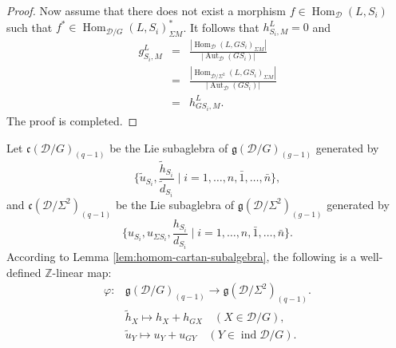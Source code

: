 \documentclass[12pt,reqno]{amsart}
\numberwithin{equation}{section}
\newcommand{\Aut}{\operatorname{Aut}\nolimits}
\newcommand{\Hom}{\operatorname{Hom}\nolimits}
\begin{document}
\begin{proof}
		Now assume that there does not exist a morphism $f\in \Hom_{\mathcal{D}}(L,S_i)$ such that $f^\ast\in \Hom_{\mathcal{D}/G}(L,S_i)^\ast_{\Sigma M}$. It follows that $h_{S_i,M}^L=0$ and
		\begin{eqnarray*}
			g_{S_i,M}^L&=&\frac{|\Hom_{\mathcal{D}}(L,GS_i)_{\Sigma M}|}{|\Aut_{\mathcal{D}}(GS_i)|}\\
			&=&\frac{|\Hom_{\mathcal{D}/\Sigma^2}(L,GS_i)_{\Sigma M}|}{|\Aut_{\mathcal{D}}(GS_i)|}\\
			&=&h_{GS_i,M}^L.
		\end{eqnarray*}
		The proof is completed.
	\end{proof}
	
	
	
	Let $\mathfrak{c}(\mathcal{D}/G)_{(q-1)}$ be the Lie subaglebra of $\mathfrak{g}(\mathcal{D}/G)_{(g-1)}$ generated by \[\{\tilde{u}_{S_i},\frac{\tilde{h}_{S_i}}{\tilde{d}_{S_i}}\mid i=1,\ldots, n,\bar{1},\ldots, \bar{n}\},\]
	and $\mathfrak{c}(\mathcal{D}/\Sigma^2)_{(q-1)}$ be the Lie subaglebra of $\mathfrak{g}(\mathcal{D}/\Sigma^2)_{(g-1)}$ generated by \[\{{u}_{S_i}, u_{\Sigma S_i},\frac{{h}_{S_i}}{{d}_{S_i}}\mid i=1,\ldots, n,\bar{1},\ldots, \bar{n}\}.\]
	According to Lemma \ref{lem:homom-cartan-subalgebra}, the following is a well-defined $\mathbb{Z}$-linear map:
	\begin{align*}
		\varphi: & \mathfrak{g}(\mathcal{D}/G)_{(q-1)}  \longrightarrow \mathfrak{g}(\mathcal{D}/\Sigma^2)_{(q-1)}. \\
		&\tilde{h}_{X} \longmapsto h_X+h_{GX} \quad (X\in \mathcal{D}/G),\\
		&\tilde{u}_{Y} \longmapsto u_Y+u_{GY} \quad (Y\in \operatorname{ind}\mathcal{D}/G).
	\end{align*}
	
	
	
\end{document}
